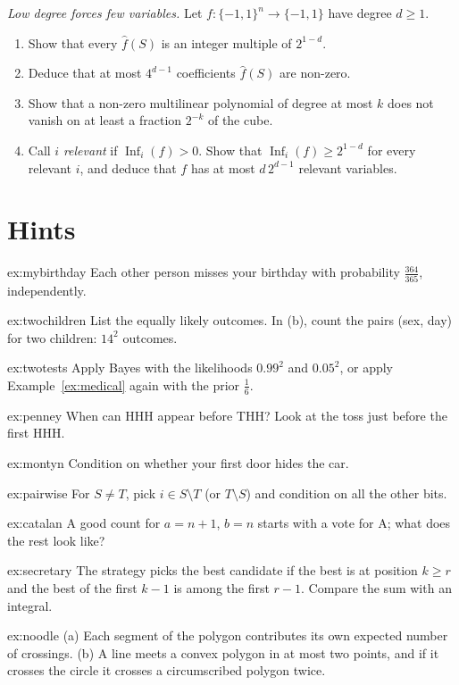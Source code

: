 \begin{exercise}[$\star\star\star$]\label{pb:granularity}
\emph{Low degree forces few variables.} Let $f:\{-1,1\}^n\to\{-1,1\}$ have degree $d\ge1$.
\begin{enumerate}[label=(\alph*)]
\item Show that every $\hat f(S)$ is an integer multiple of $2^{1-d}$.
\item Deduce that at most $4^{d-1}$ coefficients $\hat f(S)$ are non-zero.
\item Show that a non-zero multilinear polynomial of degree at most $k$ does not vanish on at least a fraction $2^{-k}$ of the
cube.
\item Call $i$ \emph{relevant} if $\operatorname{Inf}_i(f)>0$. Show that $\operatorname{Inf}_i(f)\ge2^{1-d}$ for every relevant $i$, and deduce that $f$ has at most
$d\,2^{d-1}$ relevant variables.
\end{enumerate}
\end{exercise}

\section{Hints}

\begin{hint}{ex:mybirthday}
Each other person misses your birthday with probability $\frac{364}{365}$, independently.
\end{hint}
\begin{hint}{ex:twochildren}
List the equally likely outcomes. In (b), count the pairs (sex, day) for two children: $14^2$ outcomes.
\end{hint}
\begin{hint}{ex:twotests}
Apply Bayes with the likelihoods $0.99^2$ and $0.05^2$, or apply Example~\ref{ex:medical} again with the prior $\frac16$.
\end{hint}
\begin{hint}{ex:penney}
When can HHH appear before THH? Look at the toss just before the first HHH.
\end{hint}
\begin{hint}{ex:montyn}
Condition on whether your first door hides the car.
\end{hint}
\begin{hint}{ex:pairwise}
For $S\ne T$, pick $i\in S\setminus T$ (or $T\setminus S$) and condition on all the other bits.
\end{hint}
\begin{hint}{ex:catalan}
A good count for $a=n+1$, $b=n$ starts with a vote for A; what does the rest look like?
\end{hint}
\begin{hint}{ex:secretary}
The strategy picks the best candidate if the best is at position $k\ge r$ and the best of the first $k-1$ is
among the first $r-1$. Compare the sum with an integral.
\end{hint}
\begin{hint}{ex:noodle}
(a) Each segment of the polygon contributes its own expected number of crossings. (b) A line meets a convex polygon
in at most two points, and if it crosses the circle it crosses a circumscribed polygon twice.
\end{hint}

